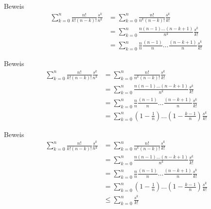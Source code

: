 \documentclass[10pt]{beamer}
\begin{document}
\begin{frame}{Beweis}
    \begin{align*}
        \sum_{k = 0}^{n} \frac{n!}{k! \left( n - k \right)!} \frac{s^{k}}{n^{k}}
        & = \sum_{k = 0}^{n} \frac{n!}{n^{k} \left( n - k \right)!} \frac{s^{k}}{k!} \\
        & = \sum_{k = 0}^{n} \frac{n \left( n - 1 \right) \ldots \left( n - k + 1 \right)}{n^{k}} \frac{s^{k}}{k!} \\
        & = \sum_{k = 0}^{n} \frac{n}{n} \frac{\left( n - 1 \right)}{n} \ldots \frac{\left( n - k + 1 \right)}{n} \frac{s^{k}}{k!}
    \end{align*}
\end{frame}



\begin{frame}{Beweis}
    \begin{align*}
        \sum_{k = 0}^{n} \frac{n!}{k! \left( n - k \right)!} \frac{s^{k}}{n^{k}}
        & = \sum_{k = 0}^{n} \frac{n!}{n^{k} \left( n - k \right)!} \frac{s^{k}}{k!} \\
        & = \sum_{k = 0}^{n} \frac{n \left( n - 1 \right) \ldots \left( n - k + 1 \right)}{n^{k}} \frac{s^{k}}{k!} \\
        & = \sum_{k = 0}^{n} \frac{n}{n} \frac{\left( n - 1 \right)}{n} \ldots \frac{\left( n - k + 1 \right)}{n} \frac{s^{k}}{k!} \\
        & = \sum_{k = 0}^{n} \left( 1 - \frac{1}{n} \right) \ldots \left( 1 - \frac{k - 1}{n} \right) \frac{s^{k}}{k!}
    \end{align*}
\end{frame}



\begin{frame}{Beweis}
    \begin{align*}
        \sum_{k = 0}^{n} \frac{n!}{k! \left( n - k \right)!} \frac{s^{k}}{n^{k}}
        & = \sum_{k = 0}^{n} \frac{n!}{n^{k} \left( n - k \right)!} \frac{s^{k}}{k!} \\
        & = \sum_{k = 0}^{n} \frac{n \left( n - 1 \right) \ldots \left( n - k + 1 \right)}{n^{k}} \frac{s^{k}}{k!} \\
        & = \sum_{k = 0}^{n} \frac{n}{n} \frac{\left( n - 1 \right)}{n} \ldots \frac{\left( n - k + 1 \right)}{n} \frac{s^{k}}{k!} \\
        & = \sum_{k = 0}^{n} \left( 1 - \frac{1}{n} \right) \ldots \left( 1 - \frac{k - 1}{n} \right) \frac{s^{k}}{k!} \\
        & \leq \sum_{k = 0}^{n} \frac{s^{k}}{k!}
    \end{align*}
\end{frame}
\end{document}
